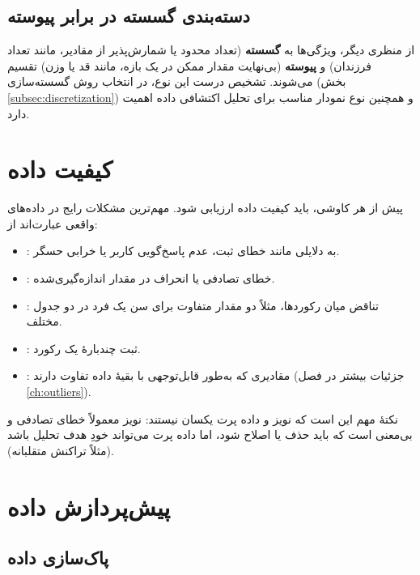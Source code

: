 \subsection{دسته‌بندی گسسته در برابر پیوسته}

از منظری دیگر، ویژگی‌ها به \textbf{گسسته} (تعداد محدود یا شمارش‌پذیر از
مقادیر، مانند تعداد فرزندان) و \textbf{پیوسته} (بی‌نهایت مقدار ممکن در یک
بازه، مانند قد یا وزن) تقسیم می‌شوند. تشخیص درست این نوع، در انتخاب روش
گسسته‌سازی (بخش \ref{subsec:discretization}) و همچنین نوع نمودار مناسب برای
تحلیل اکتشافی داده اهمیت دارد.

\section{کیفیت داده}
\label{sec:data-quality}

پیش از هر کاوشی، باید کیفیت داده ارزیابی شود. مهم‌ترین مشکلات رایج در داده‌های
واقعی عبارت‌اند از:

\begin{itemize}
    \item {}: به دلایلی مانند خطای ثبت،
          عدم پاسخ‌گویی کاربر یا خرابی حسگر.
    \item {}: خطای تصادفی یا انحراف در مقدار اندازه‌گیری‌شده.
    \item {}: تناقض میان رکوردها،
          مثلاً دو مقدار متفاوت برای سن یک فرد در دو جدول مختلف.
    \item {}: ثبت چندبارهٔ یک رکورد.
    \item {}: مقادیری که به‌طور قابل‌توجهی با
          بقیهٔ داده تفاوت دارند (جزئیات بیشتر در فصل \ref{ch:outliers}).
\end{itemize}

نکتهٔ مهم این است که نویز و داده پرت یکسان نیستند: نویز معمولاً خطای تصادفی
و بی‌معنی است که باید حذف یا اصلاح شود، اما داده پرت می‌تواند خودِ هدف تحلیل
باشد (مثلاً تراکنش متقلبانه).

\section{پیش‌پردازش داده}
\label{sec:preprocessing}

\subsection{پاک‌سازی داده}


